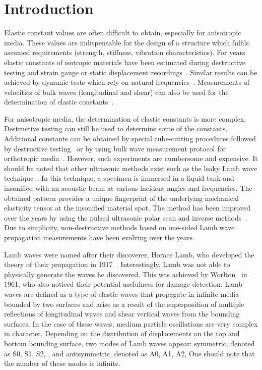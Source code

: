 		
			
\section{Introduction}
		Elastic constant values are often difficult to obtain, especially for anisotropic media. These values are indispensable for the design of a structure which fulfils assumed requirements (strength, stiffness, vibration characteristics). For years elastic constants of isotropic materials have been estimated during destructive testing and strain gauge or static displacement recordings~\cite{Wang2000}. Similar results can be achieved by dynamic tests which rely on natural frequencies~\cite{Wang2000a, Wesolowski2009,Beluch2014}. Measurements of velocities of bulk waves (longitudinal and shear) can also be used for the determination of elastic constants~\cite{Rose1999}.
	
	For anisotropic media, the determination of elastic constants is more complex. Destructive testing can still be used to determine some of the constants. Additional constants can be obtained by special cube-cutting procedures followed by destructive testing~\cite{Rose1991} or by using bulk wave measurement protocol for orthotropic media~\cite{Rose1999}. However, such experiments are cumbersome and expensive.  It should be noted that other ultrasonic methods exist such as the leaky Lamb wave technique~\cite{Karim1990,Karim1990a}. In this technique, a specimen is immersed in a liquid tank and insonified with an acoustic beam at various incident angles and frequencies. The obtained pattern provides a unique fingerprint of the underlying mechanical elasticity tensor at the insonified material spot. The method has been improved over the years by using the pulsed ultrasonic polar scan and inverse methods~\cite{Kersemans2014,Martens2017}. Due to simplicity, non-destructive methods based on one-sided Lamb wave propagation measurements have been evolving over the years.
	
	Lamb waves were named after their discoverer, Horace Lamb, who developed the theory of their propagation in 1917~\cite{Lamb1917}. Interestingly, Lamb was not able to physically generate the waves he discovered. This was achieved by Worlton~\cite{Worlton1961} in 1961, who also noticed their potential usefulness for damage detection. Lamb waves are defined as a type of elastic waves that propagate in infinite media bounded by two surfaces and arise as a result of the superposition of multiple reflections of longitudinal waves and shear vertical waves from the bounding surfaces. In the case of these waves, medium particle oscillations are very complex in character. Depending on the distribution of displacements on the top and bottom bounding surface, two modes of Lamb waves appear: symmetric, denoted as S0, S1, S2, , and antisymmetric, denoted as A0, A1, A2,  One should note that the number of these modes is infinite.
	
